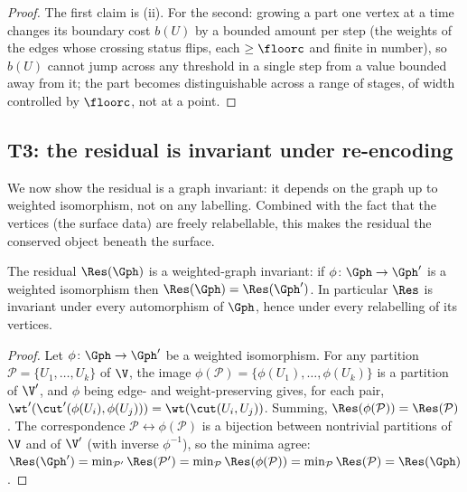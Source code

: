 \begin{proof}
The first claim is (ii). For the second: growing a
part one vertex at a time changes its boundary cost $b(U)$ by a bounded amount
per step (the weights of the edges whose crossing status flips, each $\ge
\floorc$ and finite in number), so $b(U)$ cannot jump across any threshold in a
single step from a value bounded away from it; the part becomes distinguishable
across a range of stages, of width controlled by $\floorc$, not at a point.
\end{proof}

\subsection{T3: the residual is invariant under re-encoding}

We now show the residual is a graph invariant: it depends on the graph up to
weighted isomorphism, not on any labelling. Combined with the fact that the
vertices (the surface data) are freely relabellable, this makes the residual the
conserved object beneath the surface.

\begin{theorem}
\label{thm:residual-invariant}
The residual $\Res(\Gph)$ is a weighted-graph invariant: if
$\phi\colon\Gph\to\Gph'$ is a weighted isomorphism then
$\Res(\Gph)=\Res(\Gph')$. In particular $\Res$ is invariant under every
automorphism of $\Gph$, hence under every relabelling of its vertices.
\end{theorem}

\begin{proof}
Let $\phi\colon\Gph\to\Gph'$ be a weighted isomorphism. For any partition
$\mathcal{P}=\{U_1,\dots,U_k\}$ of $\V$, the image
$\phi(\mathcal{P})=\{\phi(U_1),\dots,\phi(U_k)\}$ is a partition of $\V'$, and
$\phi$ being edge- and weight-preserving gives, for each pair,
$\wt'(\cut'(\phi(U_i),\phi(U_j)))=\wt(\cut(U_i,U_j))$. Summing,
$\Res(\phi(\mathcal{P}))=\Res(\mathcal{P})$. The correspondence
$\mathcal{P}\leftrightarrow\phi(\mathcal{P})$ is a bijection between nontrivial
partitions of $\V$ and of $\V'$ (with inverse $\phi^{-1}$), so the minima agree:
$\Res(\Gph')=\min_{\mathcal{P}'}\Res(\mathcal{P}')=
\min_{\mathcal{P}}\Res(\phi(\mathcal{P}))=\min_{\mathcal{P}}\Res(\mathcal{P})=
\Res(\Gph)$.
\end{proof}

